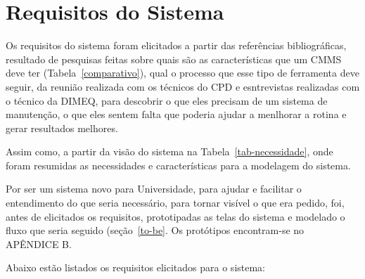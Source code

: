 
\section{Requisitos do Sistema}

Os requisitos do sistema foram elicitados a partir das referências bibliográficas, resultado de pesquisas feitas sobre quais são as características que um CMMS deve ter (Tabela~\ref{comparativo}), qual o processo que esse tipo de ferramenta deve seguir, da reunião realizada com os técnicos do CPD e esntrevistas realizadas com o técnico da DIMEQ, para descobrir o que eles precisam de um sistema de manutenção, o que eles sentem falta que poderia ajudar a menlhorar a rotina e gerar resultados melhores.

Assim como, a partir da visão do sistema na Tabela~\ref{tab-necessidade}, onde foram resumidas as necessidades e características para a modelagem do sistema. 

Por ser um sistema novo para Universidade, para ajudar e facilitar o entendimento do que seria necessário, para tornar visível o que era pedido, foi, antes de elicitados os requisitos, prototipadas as telas do sistema e modelado o fluxo que seria seguido (seção~\ref{to-be}. Os protótipos encontram-se no APÊNDICE B.

Abaixo estão listados os requisitos elicitados para o sistema:

